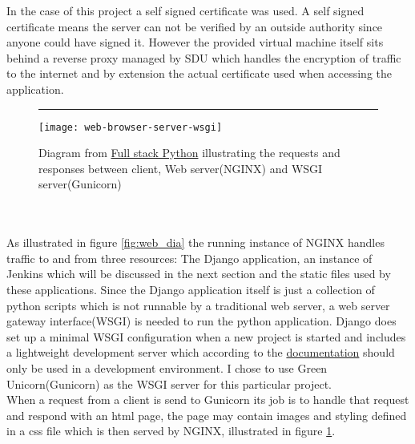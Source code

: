 In the case of this project a self signed certificate was used. A self signed certificate means the server can not be verified by an outside authority since anyone could have signed it. However the provided virtual machine itself sits behind a reverse proxy managed by SDU which handles the encryption of traffic to the internet and by extension the actual certificate used when accessing the application.
\begin{figure}[b]
\centering
\hrule
\vspace*{0.2cm}
\texttt{[image: web-browser-server-wsgi]}
\caption{Diagram from \href{https://www.fullstackpython.com/wsgi-servers.html}{Full stack Python} illustrating the requests and responses between client, Web server(NGINX) and WSGI server(Gunicorn)}
\label{fig:baf}
\end{figure}
\\\\
As illustrated in figure \ref{fig:web_dia} the running instance of NGINX handles traffic to and from three resources: The Django application, an instance of Jenkins which will be discussed in the next section and the static files used by these applications. Since the Django application itself is just a collection of python scripts which is not runnable by a traditional web server, a web server gateway interface(WSGI) is needed to run the python application. Django does set up a minimal WSGI configuration when a new project is started and includes a lightweight development server which according to the \href{https://docs.djangoproject.com/en/4.2/ref/django-admin/#runserver}{documentation} should only be used in a development environment. I chose to use Green Unicorn(Gunicorn) as the WSGI server for this particular project.\\
When a request from a client is send to Gunicorn its job is to handle that request and respond with an html page, the page may contain images and styling defined in a css file which is then served by NGINX, illustrated in figure \ref{fig:baf}.


